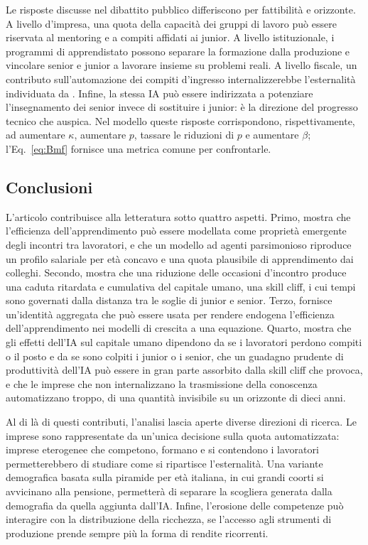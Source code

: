 \documentclass[preprint,12pt,authoryear]{elsarticle}
\begin{document}
Le risposte discusse nel dibattito pubblico differiscono per fattibilità e orizzonte. A livello d'impresa, una quota della capacità dei gruppi di lavoro può essere riservata al mentoring e a compiti affidati ai junior. A livello istituzionale, i programmi di apprendistato possono separare la formazione dalla produzione e vincolare senior e junior a lavorare insieme su problemi reali. A livello fiscale, un contributo sull'automazione dei compiti d'ingresso internalizzerebbe l'esternalità individuata da \citet{Ide2026}. Infine, la stessa IA può essere indirizzata a potenziare l'insegnamento dei senior invece di sostituire i junior: è la direzione del progresso tecnico che \citet{Acemoglu2024} auspica. Nel modello queste risposte corrispondono, rispettivamente, ad aumentare $\kappa$, aumentare $p$, tassare le riduzioni di $p$ e aumentare $\beta$; l'Eq.~\eqref{eq:Bmf} fornisce una metrica comune per confrontarle.

\subsection{Conclusioni}

L'articolo contribuisce alla letteratura sotto quattro aspetti. Primo, mostra che l'efficienza dell'apprendimento può essere modellata come proprietà emergente degli incontri tra lavoratori, e che un modello ad agenti parsimonioso riproduce un profilo salariale per età concavo e una quota plausibile di apprendimento dai colleghi. Secondo, mostra che una riduzione delle occasioni d'incontro produce una caduta ritardata e cumulativa del capitale umano, una skill cliff, i cui tempi sono governati dalla distanza tra le soglie di junior e senior. Terzo, fornisce un'identità aggregata che può essere usata per rendere endogena l'efficienza dell'apprendimento nei modelli di crescita a una equazione. Quarto, mostra che gli effetti dell'IA sul capitale umano dipendono da se i lavoratori perdono compiti o il posto e da se sono colpiti i junior o i senior, che un guadagno prudente di produttività dell'IA può essere in gran parte assorbito dalla skill cliff che provoca, e che le imprese che non internalizzano la trasmissione della conoscenza automatizzano troppo, di una quantità invisibile su un orizzonte di dieci anni.

Al di là di questi contributi, l'analisi lascia aperte diverse direzioni di ricerca. Le imprese sono rappresentate da un'unica decisione sulla quota automatizzata: imprese eterogenee che competono, formano e si contendono i lavoratori permetterebbero di studiare come si ripartisce l'esternalità. Una variante demografica basata sulla piramide per età italiana, in cui grandi coorti si avvicinano alla pensione, permetterà di separare la scogliera generata dalla demografia da quella aggiunta dall'IA. Infine, l'erosione delle competenze può interagire con la distribuzione della ricchezza, se l'accesso agli strumenti di produzione prende sempre più la forma di rendite ricorrenti.
\end{document}
